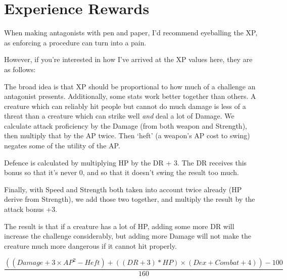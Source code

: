 \chapter{Experience Rewards}

\begin{multicols}{2}

\noindent When making antagonists with pen and paper, I'd recommend eyeballing the XP, as enforcing a procedure can turn into a pain.

However, if you're interested in how I've arrived at the XP values here, they are as follows:

The broad idea is that XP should be proportional to how much of a challenge an antagonist presents.
Additionally, some stats work better together than others.
A creature which can reliably hit people but cannot do much damage is less of a threat than a creature which can strike well \emph{and} deal a lot of Damage.
We calculate attack proficiency by the Damage (from both weapon and Strength), then multiply that by the AP twice.
Then `heft' (a weapon's AP cost to swing) negates some of the utility of the AP.

Defence is calculated by multiplying HP by the DR + 3.
The DR receives this bonus so that it's never 0, and so that it doesn't swing the result too much.

Finally, with Speed and Strength both taken into account twice already (HP derive from Strength), we add those two together, and multiply the result by the attack bonus +3.

The result is that if a creature has a lot of HP, adding some more DR will increase the challenge considerably, but adding more Damage will not make the creature much more dangerous if it cannot hit properly.

\end{multicols}

\begin{equation}
\frac{((Damage + 3 \times AP^2 - Heft) + ((DR + 3) * HP) \times (Dex + Combat + 4)) - 100}{160}
\end{equation}

